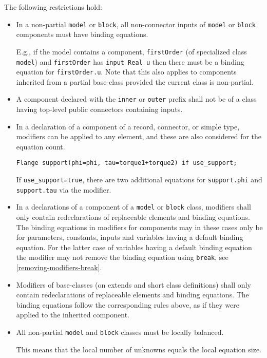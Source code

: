The following restrictions hold:
\begin{itemize}
\item
  In a non-partial \lstinline!model! or \lstinline!block!, all non-connector inputs of \lstinline!model! or \lstinline!block! components must have binding equations.
  \begin{nonnormative}
  E.g., if the model contains a component, \lstinline!firstOrder! (of specialized class \lstinline!model!) and \lstinline!firstOrder! has
  \lstinline!input Real u! then there must be a binding equation for \lstinline!firstOrder.u!.
  Note that this also applies to components inherited from a partial base-class provided the current class is non-partial.
  \end{nonnormative}
\item
  A component declared with the \lstinline!inner! or \lstinline!outer! prefix shall not be of a class having top-level public connectors containing inputs.
\item
  In a declaration of a component of a record, connector, or simple type, modifiers can be applied to any element, and these are also considered for the equation count.
\begin{example}
\begin{lstlisting}[language=modelica]
Flange support(phi=phi, tau=torque1+torque2) if use_support;
\end{lstlisting}
  If \lstinline!use_support=true!, there are two additional equations for \lstinline!support.phi! and \lstinline!support.tau! via the modifier.
\end{example}
\item
  In a declarations of a component of a \lstinline!model! or \lstinline!block! class, modifiers shall only contain redeclarations of replaceable elements and binding equations.
  The binding equations in modifiers for components may in these cases only be for parameters, constants, inputs and variables having a default binding equation.
  For the latter case of variables having a default binding equation the modifier may not remove the binding equation using \lstinline!break!, see \cref{removing-modifiers-break}.
\item
  Modifiers of base-classes (on extends and short class definitions) shall only contain redeclarations of replaceable elements and binding equations.
  The binding equations follow the corresponding rules above, as if they were applied to the inherited component.
\item
  All non-partial \lstinline!model! and \lstinline!block! classes must be locally balanced.
  \begin{nonnormative}
  This means that the local number of unknowns equals the local equation size.
  \end{nonnormative}
\end{itemize}

